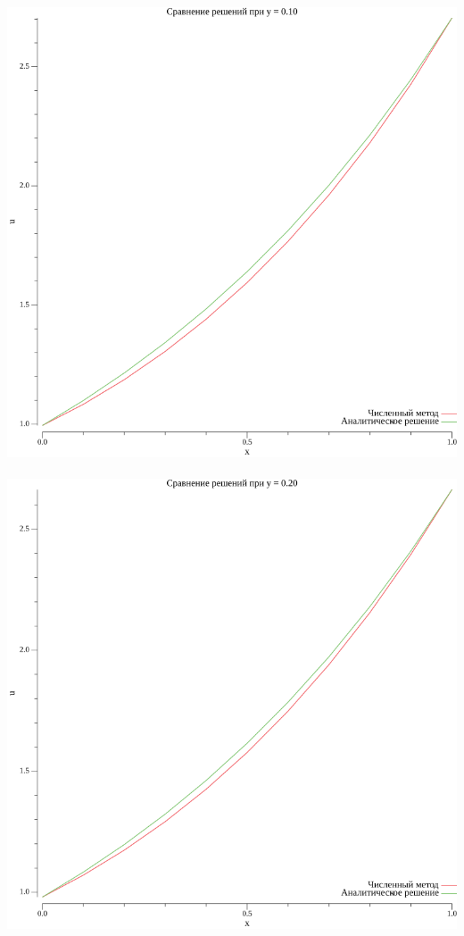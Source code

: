 \documentclass{article}
\begin{document}
\\
\includegraphics[scale=0.6]{0plot_y_0.10.png}
\\

\\
\includegraphics[scale=0.6]{0plot_y_0.20.png}
\\
\end{document}
